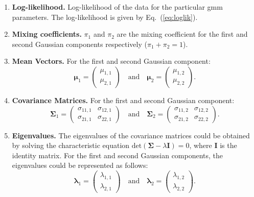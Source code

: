 \begin{enumerate}
    \item \textbf{Log-likelihood.} Log-likelihood of the data for the particular \gls{gmm} parameters. The log-likelihood is given by Eq.~(\ref{eq:loglik}).

    \item \textbf{Mixing coefficients.} \( \pi_1 \) and \( \pi_2 \) are the mixing coefficient for the first and second Gaussian components respectively (\( \pi_1 + \pi_2 = 1 \)).

    \item \textbf{Mean Vectors.} For the first and second Gaussian component:
    \[
    \boldsymbol{\mu}_1 = \begin{pmatrix} \mu_{1,1} \\ \mu_{2,1} \end{pmatrix} \quad \text{and} \quad 
    \boldsymbol{\mu}_2 = \begin{pmatrix} \mu_{1,2} \\ \mu_{2,2} \end{pmatrix} {.}
    \]
    
    \item \textbf{Covariance Matrices.} For the first and second Gaussian component:
    \[
    \boldsymbol{\Sigma}_1 = \begin{pmatrix} \sigma_{11,1} & \sigma_{12,1} \\ \sigma_{21,1} & \sigma_{22,1} \end{pmatrix}
    \quad \text{and} \quad
    \boldsymbol{\Sigma}_2 = \begin{pmatrix} \sigma_{11,2} & \sigma_{12,2} \\ \sigma_{21,2} & \sigma_{22,2} \end{pmatrix} {.}
    \]
    
    \item \textbf{Eigenvalues.} The eigenvalues of the covariance matrices could be obtained by solving the characteristic equation \(\text{det}(\boldsymbol{\Sigma} - \lambda \boldsymbol{I}) = 0\), where \(\boldsymbol{I}\) is the identity matrix. For the first and second Gaussian components, the eigenvalues could be represented as follows:
    \[
    \boldsymbol{\lambda}_1 = \begin{pmatrix} \lambda_{1,1} \\ \lambda_{2,1} \end{pmatrix} \quad \text{and} \quad 
    \boldsymbol{\lambda}_2 = \begin{pmatrix} \lambda_{1,2} \\ \lambda_{2,2} \end{pmatrix} {.}
    \]
\end{enumerate}

